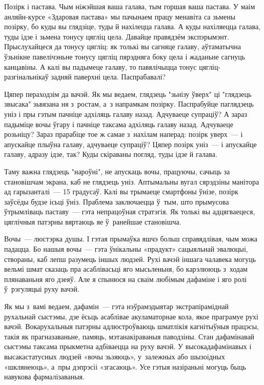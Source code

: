 Позірк і пастава. Чым ніжэйшая ваша галава, тым горшая ваша пастава. У маім анляйн-курсе «Здаровая пастава» мы пачынаем працу менавіта са зьмены позірку, бо куды вы глядзіце, туды й нахілецца галава. А куды нахіляецца галава, туды ідзе і зьмена тонусу цягліц цела. Давайце правядзём экспэрымэнт. Прыслухайцеся да тонусу цягліц: як толькі вы сагняце галаву, аўтаматычна ўзьнікне павелічэньне тонусу цягліц пярэдняга боку цела і жаданьне сагнуць канцавіны. А калі вы падымеце галаву, то павялічыцца тонус цягліц-разгінальнікаў задняй паверхні цела. Паспрабавалі?

Цяпер пераходзім да вачэй. Як мы ведаем, глядзець "зьнізу ўверх" ці "глядзець звысака" зьвязана ня з~ростам, а~з напрамкам позірку. Паспрабуйце паглядзець уніз і пры гэтым пачніце адхіляць галаву назад. Адчуваеце супраціў? А зараз падыміце вочы ўгару і пачніце таксама адхіляць галаву назад. Адчуваеце розьніцу? Зараз прарабіце тое ж самае з~нахілам наперад: позірк уверх~--- і апускайце плыўна галаву, адчуваеце супраціў? Цяпер позірк уніз~--- і апускайце галаву, адразу ідзе, так? Куды скіраваны погляд, туды ідзе й галава.

Таму важна глядзець "нароўні", не апускаць вочы, працуючы, сачыць за становішчам экрана, каб не глядзець уніз. Аптымальны вугал сярэдзіны манітора ад гарызанталі~--- 15 градусаў. Калі вы трымаеце смартфоны ўнізе, позірк заўсёды будзе ісьці ўніз. Праблема заключаецца ў~тым, што прымусова ўтрымліваць паставу~--- гэта непрацоўная стратэгія. Як толькі вы адцягваецеся, цяглічныя патэрны вяртаюць яе ў~ранейшае становішча.

Вочы~--- люстэрка душы. І гэтая прымаўка яшчэ больш справядлівая, чым можа падацца. Бо нашыя вочы~--- гэта ўнікальны «прадукт» сацыяльнай эвалюцыі, створаны, каб лепш разумець іншых людзей. Рухі вачэй іншага чалавека могуць вельмі шмат сказаць пра асаблівасьці яго мысьленьня, бо карэлююць з~ходам плянаваньня яго дзеяў. Але я спынюся на сваім любімым дафаміне і яго ролі ў~рэгуляцыі руху вачэй.

Як мы з~вамі ведаем, дафамін~--- гэта нэўрамэдыятар экстрапіраміднай рухальнай сыстэмы, дзе ёсьць асаблівае акуламаторнае кола, якое праграмуе рухі вачэй. Вокарухальныя патэрны адлюстроўваюць шматлікія кагнітыўныя працэсы, такія як прагназаваньне, памяць, мэтанакіраваныя паводзіны. Стан дафамінавай сыстэмы таксама прыкметна адбіваецца на руху вачэй. У высокадафамінавых і высакастатусных людзей «вочы зьзяюць», у~залежных або шызоідных «шклянеюць», а~пры дэпрэсіі «згасаюць». Усе гэтыя назіраньні могуць быць навукова фармалізаваныя.

